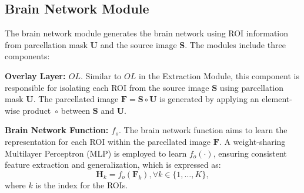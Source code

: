 
%


\vspace{-3pt}
\subsection{Brain Network Module}

The brain network module generates the brain network using ROI information from parcellation mask $\mathbf{U}$ and the source image $\mathbf{S}$. The modules include three components:


\vspace{1pt}
\noindent \textbf{Overlay Layer: $OL$}. Similar to $OL$ in the Extraction Module, this component is responsible for isolating each ROI from the source image $\mathbf{S}$ using parcellation mask $\mathbf{U}$. The parcellated image $\mathbf{F} = \mathbf{S} \circ \mathbf{U}$ is generated by applying an element-wise product~$\circ$ between $\mathbf{S}$ and $\mathbf{U}$.

\vspace{1pt}
\noindent \textbf{Brain Network Function: $f_o$}. The brain network function aims to learn the representation for each ROI within the parcellated image $\mathbf{F}$. A weight-sharing Multilayer Perceptron (MLP) is employed to learn $f_o(\cdot)$, ensuring consistent feature extraction and generalization, which is expressed as:
\begin{equation}
    \mathbf{H}_{k} = f_o(\mathbf{F}_{k}), \forall  k \in \{1 ,\ldots, K\},
\end{equation}
where $k$ is the index for the ROIs. 

